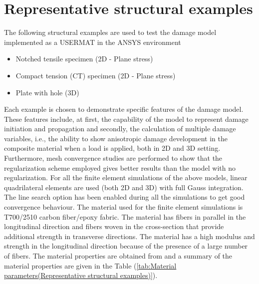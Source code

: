 \documentclass[12pt]{report}
\begin{document}
\section{Representative structural examples}
\indent\indent\indent The following structural examples are used to test the damage model implemented as a USERMAT in the ANSYS environment
\begin{itemize}
\item Notched tensile specimen (2D - Plane stress)
\item Compact tension (CT) specimen (2D - Plane stress)
\item Plate with hole (3D)
\end{itemize}
Each example is chosen to demonstrate specific features of the damage model. These features include, at first, the capability of the model to represent damage initiation and propagation and secondly, the calculation of multiple damage variables, i.e., the ability to show anisotropic damage development in the composite material when a load is applied, both in 2D and 3D setting. Furthermore, mesh convergence studies are performed to show that the regularization scheme employed gives better results than the model with no regularization. For all the finite element simulations of the above models, linear quadrilateral elements are used (both 2D and 3D) with full Gauss integration. The line search option has been enabled during all the simulations to get good convergence behaviour. The material used for the finite element simulations is T700/2510 carbon fiber/epoxy fabric. The material has fibers in parallel in the longitudinal direction and fibers woven in the cross-section that provide additional strength in transverse directions. The material has a high modulus and strength in the longitudinal direction because of the presence of a large number of fibers. The material properties are obtained from  and a summary of the material properties are given in the Table (\ref{tab:Material parameters(Representative structural examples)}). \\
\end{document}
